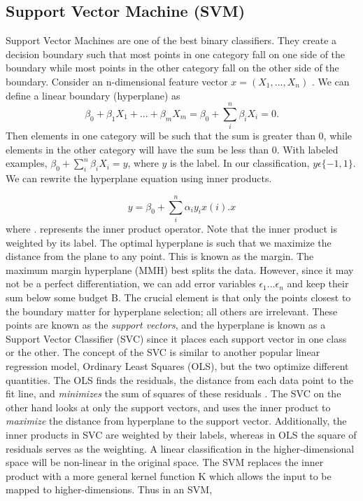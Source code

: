 \usepackage{fancyhdr}\documentclass[conference]{IEEEtran}
\begin{document}
\subsection{Support Vector Machine (SVM)}
Support Vector Machines are one of the best binary classifiers. They create a decision boundary such that most points in one category fall on one side of the boundary while most points in the other category fall on the other side of the boundary. Consider an n-dimensional feature vector $x = (X_1,...,X_n)$ \cite{8}. We can define a linear boundary (hyperplane) as
\begin{equation}
   \beta_0+ \beta_1 X_1+ ... + \beta_m X_m= \beta_0 + \sum_i ^n \beta_i X_i =0. 
\end{equation}
Then elements in one category will be such that the sum is greater than 0, while elements in the other category will have the sum be less than 0. With labeled examples, $ \beta_0 + \sum_i ^n \beta_i X_i =y$, where $y$ is the label. In our classification, $y \epsilon \{-1, 1\}$. We can rewrite the hyperplane equation using inner products.

\begin{equation}
  y= \beta_0 + \sum_i ^n \alpha_i y_i x(i).x
\end{equation}
where $.$ represents the inner product operator. Note that the inner product is weighted by its label. The optimal hyperplane is such that we maximize the distance from the plane to any point. This is known as the margin. The maximum margin hyperplane (MMH) best splits the data. However, since it may not be a perfect differentiation, we can add error variables $\epsilon_1 ...\epsilon_n$ and keep their sum below some budget B. The crucial element is that only the points closest to the boundary matter for hyperplane selection; all others are irrelevant. These points are known as the \textit{support vectors}, and the hyperplane is known as a Support Vector Classifier (SVC) since it places each support vector in
one class or the other.
The concept of the SVC is similar to another popular linear regression model, Ordinary Least Squares (OLS), but the two optimize different quantities. The OLS finds the residuals, the distance from each data point to the fit line, and \textit{minimizes} the sum of squares of these residuals \cite{9}. The SVC on the other hand looks at only the support vectors, and uses the inner product to \textit{maximize} the distance from hyperplane to the support vector. Additionally, the inner products in SVC are weighted by their labels, whereas in OLS the square of residuals serves as the weighting. A linear classification in the higher-dimensional space will be non-linear in the original space. The SVM replaces the inner product with a more general kernel function K which allows the input to be mapped to higher-dimensions. Thus in an SVM,
\end{document}
